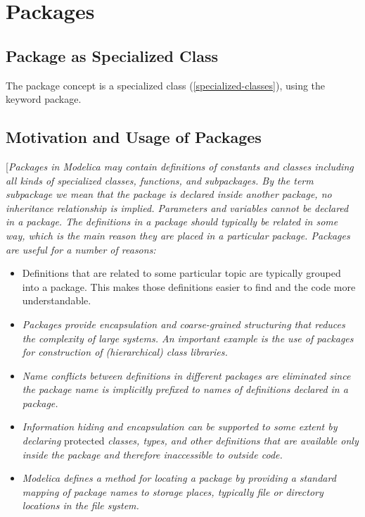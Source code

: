 \documentclass[../MLS.tex]{subfiles}
\begin{document}
\chapter{Packages}

\section{Package as Specialized Class}

The package concept is a specialized class (\autoref{specialized-classes}), using the
keyword package.

\section{Motivation and Usage of Packages}

{[}\emph{Packages in Modelica may contain definitions of constants and
classes including all kinds of specialized classes, functions, and
subpackages. By the term subpackage we mean that the package is declared
inside another package, no inheritance relationship is implied.
Parameters and variables cannot be declared in a package. The
definitions in a package should typically be related in some way, which
is the main reason they are placed in a particular package. Packages are
useful for a number of reasons:}

\begin{itemize}
\item
  Definitions that are related to some particular topic are typically
  grouped into a package. This makes those definitions easier to find
  and the code more understandable.
\item
  \emph{Packages provide encapsulation and coarse-grained structuring
  that reduces the complexity of large systems. An important example is
  the use of packages for construction of (hierarchical) class
  libraries.}
\item
  \emph{Name conflicts between definitions in different packages are
  eliminated since the package name is implicitly prefixed to names of
  definitions declared in a package.}
\item
  \emph{Information hiding and encapsulation can be supported to some
  extent by declaring} protected \emph{classes, types, and other
  definitions that are available only inside the package and therefore
  inaccessible to outside code.}
\item
  \emph{Modelica defines a method for locating a package by providing a
  standard mapping of package names to storage places, typically file or
  directory locations in the file system. }
\end{itemize}
\end{document}
